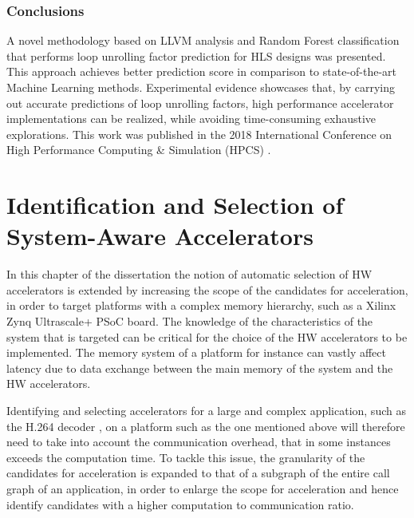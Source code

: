 \documentclass[]{usiinfthesis}
\begin{document}
\subsection{Conclusions}

A novel methodology based on LLVM analysis and Random Forest classification that performs loop unrolling 
factor prediction for HLS designs was presented. This approach achieves better prediction score 
in comparison to state-of-the-art Machine Learning methods. Experimental evidence showcases that, 
by carrying out accurate predictions of loop unrolling factors, high performance accelerator 
implementations can be realized, while avoiding time-consuming exhaustive explorations. This work was 
published in the 2018 International Conference on High Performance Computing \& Simulation (HPCS) 
\cite{ZacharopoulosJul18}.


%
%
%
%
%  
%
%
%
%
%


\chapter[Identification and Selection of System-Aware Accelerators]
{Identification and Selection of \\ System-Aware Accelerators}

In this chapter of the dissertation the notion of automatic selection of HW accelerators is extended
by increasing the scope of the candidates for acceleration, in order to target platforms 
with a complex memory hierarchy, such as a Xilinx Zynq Ultrascale+ PSoC board.
The knowledge of the characteristics of the system that is targeted can be critical for the choice of the HW accelerators
to be implemented. The memory system of a platform for instance can vastly affect latency due to data
exchange between the main memory of the system and the HW accelerators.\par

Identifying and selecting accelerators for a 
large and complex application, such as the H.264 decoder \cite{LiuFeb16}, 
on a platform such as the one mentioned 
above will therefore need to 
take into account the communication overhead, that in some instances exceeds the computation
time. To tackle this issue,
the granularity of the candidates for acceleration is 
expanded to that of a subgraph of the entire call graph of an application, in order to enlarge 
the scope for acceleration and hence identify candidates with a higher computation to communication
ratio.
\par
\end{document}
